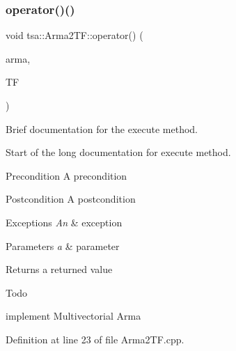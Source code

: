 \mbox{\label{classtsa_1_1_arma2_t_f_ab1e6a1c801109ef7f884317bacbe5f64}} 
\subsubsection{\texorpdfstring{operator()()}{operator()()}}
{\footnotesize\ttfamily void tsa\+::\+Arma2\+T\+F\+::operator() (\begin{DoxyParamCaption}\item[{\hyperlink{classtsa_1_1_a_r_m_a_view}{A\+R\+M\+A\+View} \&}]{arma,  }\item[{\hyperlink{namespacetsa_ab32775c889b53c40fa83939f22372b75}{Seq\+View\+Complex} \&}]{TF }\end{DoxyParamCaption})}



Brief documentation for the execute method. 

Start of the long documentation for execute method.

\begin{DoxyPrecond}{Precondition}
A precondition 
\end{DoxyPrecond}
\begin{DoxyPostcond}{Postcondition}
A postcondition 
\end{DoxyPostcond}

\begin{DoxyExceptions}{Exceptions}
{\em An} & exception\\
\hline
\end{DoxyExceptions}

\begin{DoxyParams}{Parameters}
{\em a} & parameter\\
\hline
\end{DoxyParams}
\begin{DoxyReturn}{Returns}
a returned value 
\end{DoxyReturn}
\begin{DoxyRefDesc}{Todo}
\item[\hyperlink{todo__todo000001}{Todo}]implement Multivectorial Arma \end{DoxyRefDesc}


Definition at line 23 of file Arma2\+T\+F.\+cpp.

\mbox{\label{classtsa_1_1_arma2_t_f_ac2fa5584ff0fed36eabfc908ded9b5de}} 

